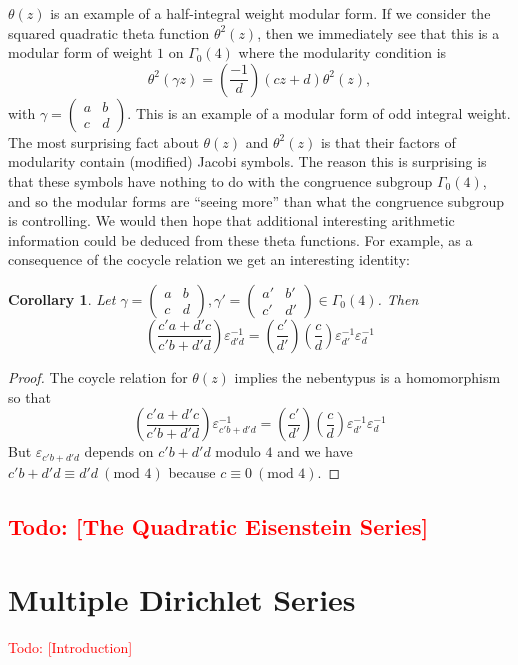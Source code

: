 \documentclass[12pt]{book}
\newtheorem{corollary}{Corollary}[section]
\theoremstyle{definition}\newframedtheorem{method}{Method}
\newcommand{\legendre}[2]{\genfrac{(}{)}{0.5pt}{0}{#1}{#2}}
\newcommand{\tmod}[1]{\ \left(\text{mod }#1\right)}
\newcommand{\g}{\gamma}
\renewcommand{\t}{\theta}
\newcommand{\G}{\Gamma}
\newcommand{\e}{\varepsilon}
\newcommand{\<}{\langle}
\renewcommand{\>}{\rangle}
\newcommand{\todo}[1]{\textcolor{red}{\sf Todo: [#1]}}
\begin{document}
    $\t(z)$ is an example of a half-integral weight modular form. If we consider the squared quadratic theta function $\t^{2}(z)$, then we immediately see that this is a modular form of weight $1$ on $\G_{0}(4)$ where the modularity condition is
    \[
      \t^{2}(\g z) = \legendre{-1}{d}(cz+d)\t^{2}(z),
    \]
    with $\g = \begin{pmatrix} a & b \\ c & d \end{pmatrix}$. This is an example of a modular form of odd integral weight. The most surprising fact about $\t(z)$ and $\t^{2}(z)$ is that their factors of modularity contain (modified) Jacobi symbols. The reason this is surprising is that these symbols have nothing to do with the congruence subgroup $\G_{0}(4)$, and so the modular forms are ``seeing more'' than what the congruence subgroup is controlling. We would then hope that additional interesting arithmetic information could be deduced from these theta functions. For example, as a consequence of the cocycle relation we get an interesting identity:

    \begin{corollary}
      Let $\g = \begin{pmatrix} a & b \\ c & d \end{pmatrix},\g' = \begin{pmatrix} a' & b' \\ c' & d' \end{pmatrix} \in \G_{0}(4)$. Then
      \[
        \legendre{c'a+d'c}{c'b+d'd}\e_{d'd}^{-1} = \legendre{c'}{d'}\legendre{c}{d}\e_{d'}^{-1}\e_{d}^{-1}
      \]
    \end{corollary}
    \begin{proof}
      The coycle relation for $\t(z)$ implies the nebentypus is a homomorphism so that
      \[
        \legendre{c'a+d'c}{c'b+d'd}\e_{c'b+d'd}^{-1} = \legendre{c'}{d'}\legendre{c}{d}\e_{d'}^{-1}\e_{d}^{-1}
      \]
      But $\e_{c'b+d'd}$ depends on $c'b+d'd$ modulo $4$ and we have $c'b+d'd \equiv d'd \tmod{4}$ because $c \equiv 0 \tmod{4}$.
    \end{proof}
  \section{\todo{The Quadratic Eisenstein Series}}

\chapter{Multiple Dirichlet Series}
  \todo{Introduction}
\end{document}
